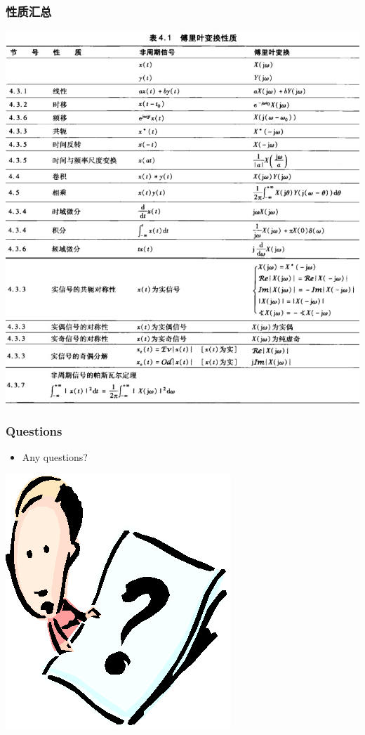 \documentclass[CJKutf8,xcolor=pdftex,dvipsnames,table]{beamer}
\begin{document}
\begin{CJK*}{UTF8}{song}
\begin{frame}
\begin{itemize}
    \end{itemize}
  \end{frame}   

  \begin{frame}
    \frametitle{性质汇总}
    \begin{center}
      \includegraphics[scale=.28]{ss-c-t4-1}
    \end{center}
  \end{frame}  

  \begin{frame}
    \frametitle{Questions}
    \begin{itemize}
    \item Any questions?
    \end{itemize}
    \begin{center}
      \includegraphics[scale=.5]{question}
    \end{center}
  \end{frame}  
  

\end{CJK*}
\end{document}

